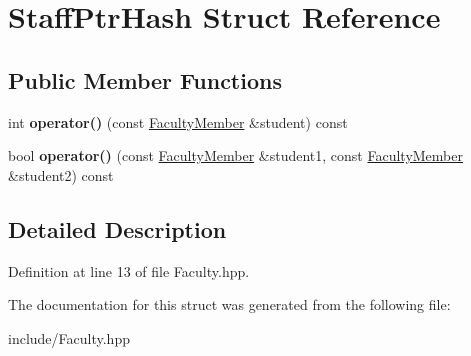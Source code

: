 \hypertarget{structStaffPtrHash}{}\section{Staff\+Ptr\+Hash Struct Reference}
\label{structStaffPtrHash}
\subsection*{Public Member Functions}
\begin{DoxyCompactItemize}
\item 
\mbox{\label{structStaffPtrHash_af25389000e72b90bdcaf0ffc768d2256}} 
int {\bfseries operator()} (const \hyperlink{classFacultyMember}{Faculty\+Member} \&student) const
\item 
\mbox{\label{structStaffPtrHash_af174a2a12736391fb476cecf87506149}} 
bool {\bfseries operator()} (const \hyperlink{classFacultyMember}{Faculty\+Member} \&student1, const \hyperlink{classFacultyMember}{Faculty\+Member} \&student2) const
\end{DoxyCompactItemize}


\subsection{Detailed Description}


Definition at line 13 of file Faculty.\+hpp.



The documentation for this struct was generated from the following file\+:\begin{DoxyCompactItemize}
\item 
include/Faculty.\+hpp\end{DoxyCompactItemize}
